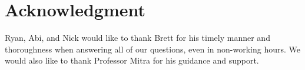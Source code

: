 \documentclass[linenumbers,RNAAS,trackchanges]{aastex631}
\begin{document}
\section{\textbf{Acknowledgment}} \label{sec:acknowledgment}
Ryan, Abi, and Nick would like to thank Brett for his timely manner and thoroughness when answering all of our questions, even in non-working hours. We would also like to thank Professor Mitra for his guidance and support. 

\newpage


\end{document}
